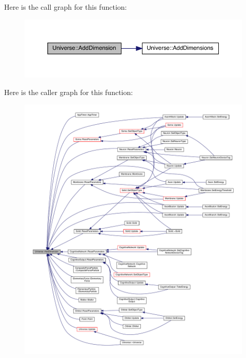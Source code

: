 Here is the call graph for this function\+:
\nopagebreak
\begin{figure}[H]
\begin{center}
\leavevmode
\includegraphics[width=350pt]{class_universe_a6326158c47bf3f7fe9297299a9b5b7b7_cgraph}
\end{center}
\end{figure}
Here is the caller graph for this function\+:
\nopagebreak
\begin{figure}[H]
\begin{center}
\leavevmode
\includegraphics[width=350pt]{class_universe_a6326158c47bf3f7fe9297299a9b5b7b7_icgraph}
\end{center}
\end{figure}
\mbox{\label{class_universe_a03bdf5f7fea4209241e9bf5316d45517}} 
